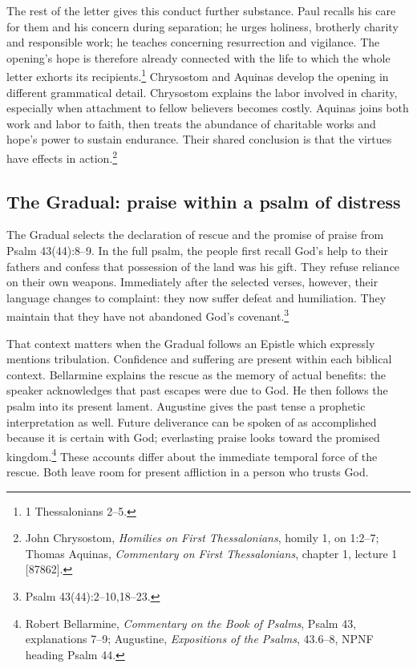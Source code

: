 The rest of the letter gives this conduct further substance. Paul recalls his care for them and his concern during separation; he urges holiness, brotherly charity and responsible work; he teaches concerning resurrection and vigilance. The opening's hope is therefore already connected with the life to which the whole letter exhorts its recipients.\footnote{1 Thessalonians 2--5.} Chrysostom and Aquinas develop the opening in different grammatical detail. Chrysostom explains the labor involved in charity, especially when attachment to fellow believers becomes costly. Aquinas joins both work and labor to faith, then treats the abundance of charitable works and hope's power to sustain endurance. Their shared conclusion is that the virtues have effects in action.\footnote{John Chrysostom, \textit{Homilies on First Thessalonians}, homily 1, on 1:2--7; Thomas Aquinas, \textit{Commentary on First Thessalonians}, chapter 1, lecture 1 [87862].}

\subsection{The Gradual: praise within a psalm of distress}

The Gradual selects the declaration of rescue and the promise of praise from Psalm 43(44):8--9. In the full psalm, the people first recall God's help to their fathers and confess that possession of the land was his gift. They refuse reliance on their own weapons. Immediately after the selected verses, however, their language changes to complaint: they now suffer defeat and humiliation. They maintain that they have not abandoned God's covenant.\footnote{Psalm 43(44):2--10,18--23.}

That context matters when the Gradual follows an Epistle which expressly mentions tribulation. Confidence and suffering are present within each biblical context. Bellarmine explains the rescue as the memory of actual benefits: the speaker acknowledges that past escapes were due to God. He then follows the psalm into its present lament. Augustine gives the past tense a prophetic interpretation as well. Future deliverance can be spoken of as accomplished because it is certain with God; everlasting praise looks toward the promised kingdom.\footnote{Robert Bellarmine, \textit{Commentary on the Book of Psalms}, Psalm 43, explanations 7--9; Augustine, \textit{Expositions of the Psalms}, 43.6--8, NPNF heading Psalm 44.} These accounts differ about the immediate temporal force of the rescue. Both leave room for present affliction in a person who trusts God.

